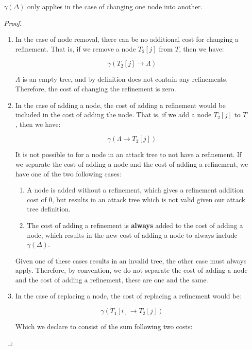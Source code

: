 \begin{lemma}\label{lem:gamma-delta}

      $\gamma(\Delta)$ only applies in the case of changing one node into another.

\begin{proof}
      

\begin{enumerate} 
\item In the case of node removal, there can be no additional cost for changing a refinement. That is, if we remove a node $T_2[j]$ from $T$, then we have:

$$\gamma(T_2[j] \rightarrow {\Lambda})$$

            $\Lambda$ is an empty tree, and by definition does not contain any refinements. Therefore, the cost of changing the refinement is zero.

\item In the case of adding a node, the cost of adding a refinement would be included in the cost of adding the node. That is, if we add a node $T_2[j]$ to $T$, then we have:

$$\gamma(\Lambda \rightarrow {T_2[j]})$$

It is not possible to for a node in an attack tree to not have a refinement. If we separate the cost of adding a node and the cost of adding a refinement, we have one of the two following cases:
\begin{enumerate}
      \item A node is added without a refinement, which gives a refinement addition cost of 0, but results in an attack tree which is not valid given our attack tree definition.
      \item The cost of adding a refinement is \textbf{always} added to the cost of adding a node, which results in the new cost of adding a node to always include $\gamma(\Delta)$.
\end{enumerate}

Given one of these cases results in an invalid tree, the other case must always apply. Therefore, by convention, we do not separate the cost of adding a node and the cost of adding a refinement, these are one and the same.

      \item In the case of replacing a node, the cost of replacing a refinement would be:

$$\gamma({T_1[i]} \rightarrow {T_2[j]})$$

Which we declare to consist of the sum following two costs:


\end{enumerate}
\end{proof}
\end{lemma}
